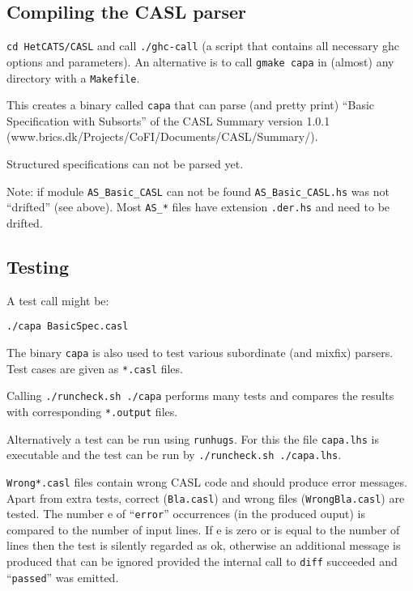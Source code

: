 \documentclass{article}
\begin{document}
\subsection{Compiling the CASL parser}

\texttt{cd HetCATS/CASL} and call \texttt{./ghc-call} (a script that
contains all necessary ghc options and parameters). An alternative is to call \texttt{gmake capa} in (almost) any directory with a \texttt{Makefile}.

This creates a binary called \texttt{capa} that can parse (and pretty
print) ``Basic Specification with Subsorts'' of the CASL Summary
version 1.0.1 \\ (www.brics.dk/Projects/CoFI/Documents/CASL/Summary/).

Structured specifications can not be parsed yet.

Note: if module \texttt{AS\_Basic\_CASL} can not be found
\texttt{AS\_Basic\_CASL.hs} was not ``drifted'' (see above). Most
\texttt{AS\_*} files have extension \texttt{.der.hs} and need to
be drifted.

\subsection{Testing}

A test call might be: 

\texttt{./capa BasicSpec.casl}

The binary \texttt{capa} is also used to test various subordinate (and
mixfix) parsers. Test cases are given as \texttt{*.casl} files.

Calling \texttt{./runcheck.sh ./capa} performs many tests and compares the
results with corresponding \texttt{*.output} files.

Alternatively a test can be run using \texttt{runhugs}. For this the
file \texttt{capa.lhs} is executable and the test can be run
by \texttt{./runcheck.sh ./capa.lhs}.

\texttt{Wrong*.casl} files contain wrong CASL code and should produce
error messages. Apart from extra tests, correct (\texttt{Bla.casl})
and wrong files (\texttt{WrongBla.casl}) are tested. The number e of
``\texttt{error}'' occurrences (in the produced ouput) is compared to the
number of input lines. If e is zero or is equal to the number of lines
then the test is silently regarded as ok, otherwise an additional message
is produced that can be ignored provided the internal call to
\texttt{diff} succeeded and ``\texttt{passed}'' was emitted.
\end{document}
